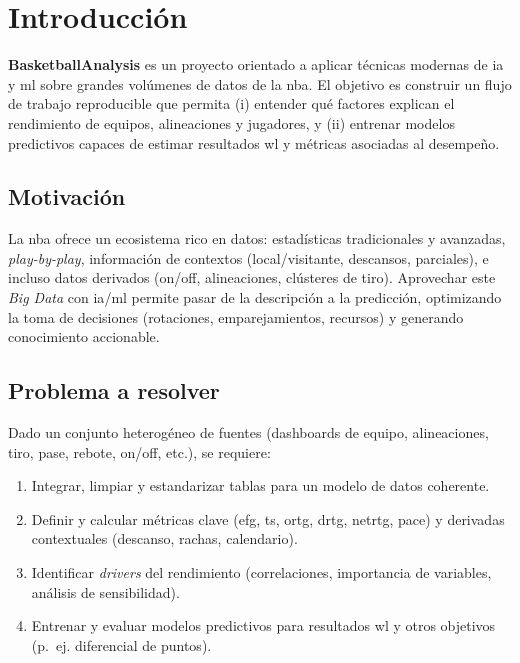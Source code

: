 \chapter{Introducción}\label{chap:introduccion}

\textbf{BasketballAnalysis} es un proyecto orientado a aplicar técnicas modernas de \gls{ia} y \gls{ml} sobre grandes volúmenes de datos de la \gls{nba}. 
El objetivo es construir un flujo de trabajo reproducible que permita (i) entender qué factores explican el rendimiento de equipos, alineaciones y jugadores, 
y (ii) entrenar modelos predictivos capaces de estimar resultados \gls{wl} y métricas asociadas al desempeño.

\section*{Motivación}
La \gls{nba} ofrece un ecosistema rico en datos: estadísticas tradicionales y avanzadas, \textit{play-by-play}, información de contextos (local/visitante, descansos, parciales), e incluso datos derivados (on/off, alineaciones, clústeres de tiro). 
Aprovechar este \textit{Big Data} con \gls{ia}/\gls{ml} permite pasar de la descripción a la predicción, optimizando la toma de decisiones (rotaciones, emparejamientos, recursos) y generando conocimiento accionable.

\section*{Problema a resolver}
Dado un conjunto heterogéneo de fuentes (dashboards de equipo, alineaciones, tiro, pase, rebote, on/off, etc.), se requiere:
\begin{enumerate}
  \item Integrar, limpiar y estandarizar tablas para un modelo de datos coherente.
  \item Definir y calcular métricas clave (\gls{efg}, \gls{ts}, \gls{ortg}, \gls{drtg}, \gls{netrtg}, \gls{pace}) y derivadas contextuales (descanso, rachas, calendario).
  \item Identificar \textit{drivers} del rendimiento (correlaciones, importancia de variables, análisis de sensibilidad).
  \item Entrenar y evaluar modelos predictivos para resultados \gls{wl} y otros objetivos (p.~ej. diferencial de puntos).
\end{enumerate}

